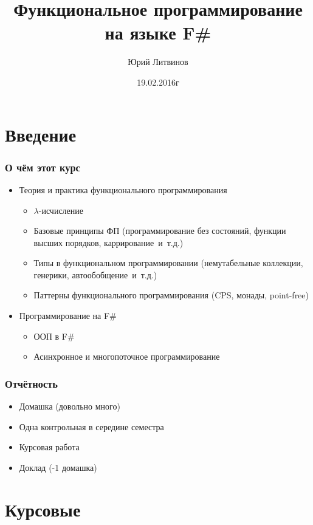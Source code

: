 \documentclass[xetex,mathserif,serif]{beamer}
\title{Функциональное программирование на языке F\#}
\author{Юрий Литвинов}
\date{19.02.2016г}
\begin{document}
	
	\frame{\titlepage}
	
	\section{Введение}
	
	\begin{frame}
		\frametitle{О чём этот курс}
		\begin{itemize}
			\item Теория и практика функционального программирования
			\begin{itemize}
				\item $\lambda$-исчисление
				\item Базовые принципы ФП (программирование без состояний, 
					функции высших порядков, каррирование~и~т.д.)
				\item Типы в функциональном программировании (немутабельные коллекции,
					генерики, автообобщение~и~т.д.)
				\item Паттерны функционального программирования (CPS, монады, point-free)
			\end{itemize}
			\item Программирование на F\# 
			\begin{itemize}
				\item ООП в F\#
				\item Асинхронное и многопоточное программирование
			\end{itemize}
		\end{itemize}
	\end{frame}

	\begin{frame}
		\frametitle{Отчётность}
		\begin{itemize}
			\item Домашка (довольно много)
			\item Одна контрольная в середине семестра
			\item Курсовая работа
			\item Доклад (-1 домашка)			
		\end{itemize}					
	\end{frame}
	
	\section{Курсовые}		
\end{document}
